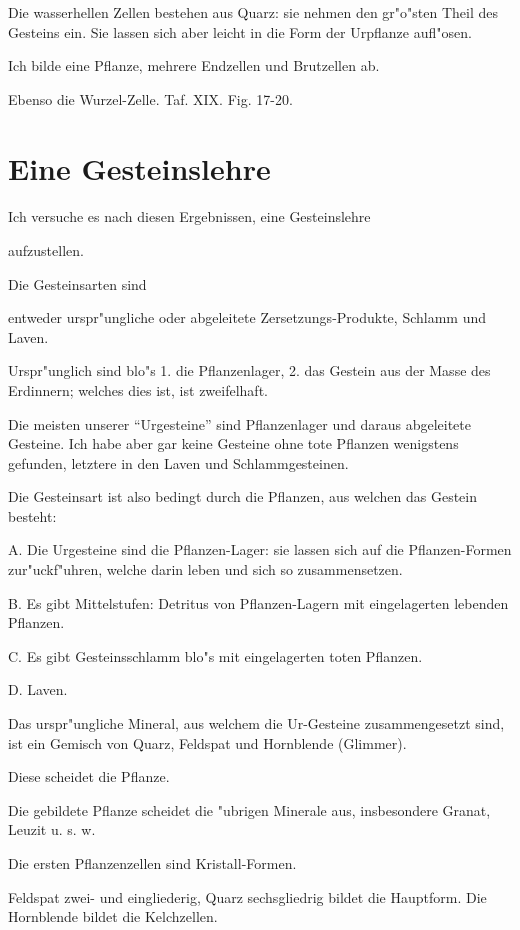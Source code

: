 \documentclass[a4paper, 11pt, oneside, german]{article}
\begin{document}
Die wasserhellen Zellen bestehen aus Quarz: sie nehmen den gr"o"sten Theil des Gesteins ein. Sie lassen sich aber leicht in die Form der Urpflanze aufl"osen.

Ich bilde eine Pflanze, mehrere Endzellen und Brutzellen ab.

Ebenso die Wurzel-Zelle. Taf. XIX. Fig. 17-20.
\clearpage
\section{Eine Gesteinslehre}
\paragraph{}
Ich versuche es nach diesen Ergebnissen,
eine Gesteinslehre

aufzustellen.

Die Gesteinsarten sind

entweder urspr"ungliche oder abgeleitete Zersetzungs-Produkte, Schlamm und Laven.

Urspr"unglich sind blo"s 1. die Pflanzenlager, 2. das Gestein aus der Masse des Erdinnern; welches dies ist, ist zweifelhaft.

Die meisten unserer "`Urgesteine"' sind Pflanzenlager und daraus abgeleitete Gesteine. Ich habe aber gar keine Gesteine ohne tote Pflanzen wenigstens gefunden, letztere in den Laven und Schlammgesteinen.

Die Gesteinsart ist also bedingt durch die Pflanzen, aus welchen das Gestein besteht:

A. Die Urgesteine sind die Pflanzen-Lager: sie lassen sich auf die Pflanzen-Formen zur"uckf"uhren, welche darin leben und sich so zusammensetzen.

B. Es gibt Mittelstufen: Detritus von Pflanzen-Lagern mit eingelagerten lebenden Pflanzen.

C. Es gibt Gesteinsschlamm blo"s mit eingelagerten toten Pflanzen.

D. Laven.

Das urspr"ungliche Mineral, aus welchem die Ur-Gesteine zusammengesetzt sind, ist ein Gemisch von Quarz, Feldspat und Hornblende (Glimmer).

Diese scheidet die Pflanze.

Die gebildete Pflanze scheidet die "ubrigen Minerale aus, insbesondere Granat, Leuzit u. s. w.

Die ersten Pflanzenzellen sind Kristall-Formen.

Feldspat zwei- und eingliederig, Quarz sechsgliedrig bildet die Hauptform. Die Hornblende bildet die Kelchzellen.
\end{document}
